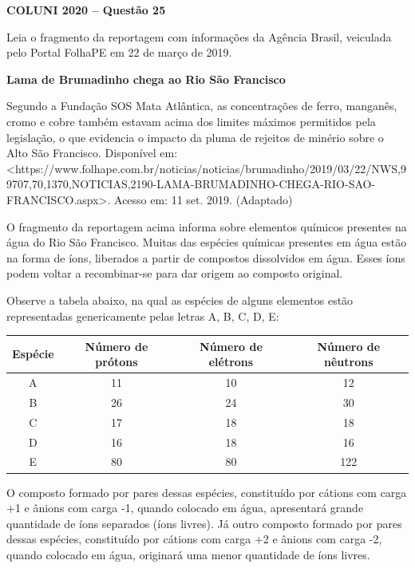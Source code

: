 \textbf{COLUNI 2020 -- Questão 25}\par\medskip Leia o fragmento da reportagem com informações da Agência Brasil, veiculada pelo Portal FolhaPE em 22 de março de 2019.

\par

\textbf{Lama de Brumadinho chega ao Rio São Francisco}

\par

Segundo a Fundação SOS Mata Atlântica, as concentrações de ferro, manganês, cromo e cobre também estavam acima dos limites máximos permitidos pela legislação, o que evidencia o impacto da pluma de rejeitos de minério sobre o Alto São Francisco. Disponível em: <https://www.folhape.com.br/noticias/noticias/brumadinho/2019/03/22/NWS,99707,70,1370,NOTICIAS,2190-LAMA-BRUMADINHO-CHEGA-RIO-SAO-FRANCISCO.aspx>. Acesso em: 11 set. 2019. (Adaptado)

\par

O fragmento da reportagem acima informa sobre elementos químicos presentes na água do Rio São Francisco. Muitas das espécies químicas presentes em água estão na forma de íons, liberados a partir de compostos dissolvidos em água. Esses íons podem voltar a recombinar-se para dar origem ao composto original.

\par

Observe a tabela abaixo, na qual as espécies de alguns elementos estão representadas genericamente pelas letras A, B, C, D, E:

\par

\begin{center}
\begin{tabular}{|c|c|c|c|}
\hline
Espécie & Número de prótons & Número de elétrons & Número de nêutrons \\
\hline
A & 11 & 10 & 12 \\
\hline
B & 26 & 24 & 30 \\
\hline
C & 17 & 18 & 18 \\
\hline
D & 16 & 18 & 16 \\
\hline
E & 80 & 80 & 122 \\
\hline
\end{tabular}
\end{center}

\par

O composto formado por pares dessas espécies, constituído por cátions com carga +1 e ânions com carga -1, quando colocado em água, apresentará grande quantidade de íons separados (íons livres). Já outro composto formado por pares dessas espécies, constituído por cátions com carga +2 e ânions com carga -2, quando colocado em água, originará uma menor quantidade de íons livres.

